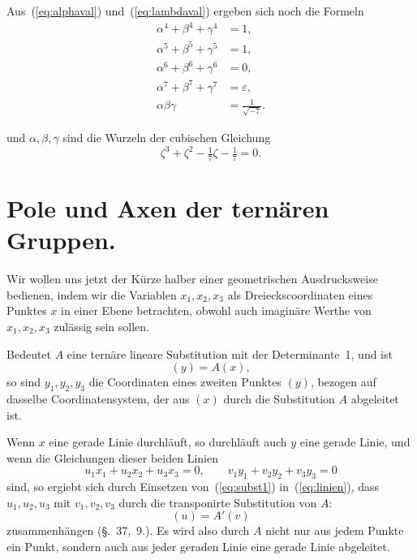 \documentclass[12pt,a4paper]{article}
\begin{document}
Aus~(\ref{eq:alphaval}) und~(\ref{eq:lambdaval}) ergeben sich noch die Formeln
\begin{align}
\label{eq:rel3} \alpha^4 + \beta^4 + \gamma^4 &= 1,\\
\alpha^5 + \beta^5 + \gamma^5 &= 1,\nonumber\\
\alpha^6 + \beta^6 + \gamma^6 &= 0,\nonumber\\
\alpha^7 + \beta^7 + \gamma^7 &= \varepsilon,\nonumber\\
\alpha\beta\gamma &= \tfrac{1}{\sqrt{-7}}.\nonumber
\end{align}

und $\alpha, \beta, \gamma$ sind die Wurzeln der cubischen Gleichung
\begin{equation}
\label{eq:cubic} \zeta^3 + \zeta^2 - \tfrac{1}{7}\zeta - \tfrac{1}{7} = 0.
\end{equation}

\newpage
\section{Pole und Axen der tern\"aren Gruppen.}
\label{sec:116}

Wir wollen uns jetzt der K\"urze halber einer geometrischen Ausdrucksweise bedienen, indem wir die Variablen $x_1, x_2, x_3$ als Dreieckscoordinaten eines Punktes $x$ in einer Ebene betrachten, obwohl auch imagin\"are Werthe von $x_1, x_2, x_3$ zul\"assig sein sollen.

Bedeutet $A$ eine tern\"are lineare Substitution mit der Determinante~1, und ist
\begin{equation}
\label{eq:subst1} (y) = A(x),
\end{equation}
so sind $y_1, y_2, y_3$ die Coordinaten eines zweiten Punktes $(y)$, bezogen auf dasselbe Coordinatensystem, der aus $(x)$ durch die Substitution $A$ abgeleitet ist.

Wenn $x$ eine gerade Linie durchl\"auft, so durchl\"auft auch $y$ eine gerade Linie, und wenn die Gleichungen dieser beiden Linien
\begin{equation}
\label{eq:linien} u_1x_1 + u_2x_2 + u_3x_3 = 0, \qquad v_1y_1 + v_2y_2 + v_3y_3 = 0
\end{equation}
sind, so ergiebt sich durch Einsetzen von~(\ref{eq:subst1}) in~(\ref{eq:linien}), dass $u_1, u_2, u_3$ mit $v_1, v_2, v_3$ durch die transponirte Substitution von $A$:
\begin{equation}
\label{eq:transponiert} (u) = A'(v)
\end{equation}
zusammenh\"angen (\S.~37,~9.). Es wird also durch $A$ nicht nur aus jedem Punkte ein Punkt, sondern auch aus jeder geraden Linie eine gerade Linie abgeleitet.
\end{document}
